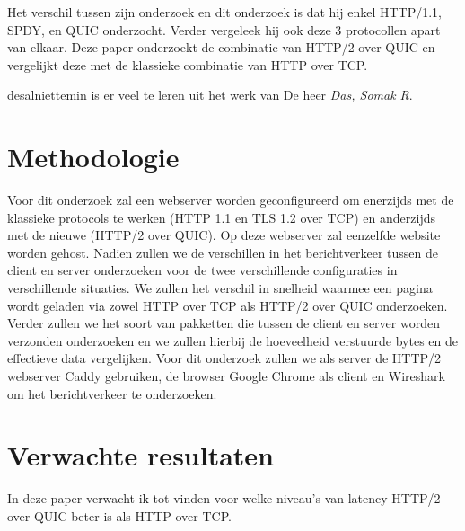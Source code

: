 \documentclass[fleqn,10pt]{voorstel}
\begin{document}
Het verschil tussen zijn onderzoek en dit onderzoek is dat hij enkel
HTTP/1.1, SPDY, en QUIC onderzocht. Verder vergeleek hij ook deze 3  protocollen apart van elkaar. Deze paper onderzoekt de combinatie van HTTP/2 over QUIC en vergelijkt deze met de klassieke combinatie van HTTP over TCP. 

desalniettemin is er veel te leren uit het werk van De heer \emph{Das, Somak R}.



\section{Methodologie}
\label{sec:methodologie}

Voor dit onderzoek zal een webserver worden geconfigureerd om 
enerzijds met de klassieke protocols te werken (HTTP 1.1 en TLS 1.2 over TCP) en anderzijds met de nieuwe (HTTP/2 over QUIC). Op deze webserver zal eenzelfde website worden gehost. Nadien zullen we de verschillen in het berichtverkeer tussen de client en server onderzoeken voor de twee verschillende configuraties in verschillende situaties.
We zullen het verschil in snelheid waarmee een pagina wordt
geladen via zowel HTTP over TCP als HTTP/2 over QUIC
onderzoeken. Verder zullen we het soort van pakketten die
tussen de client en server worden verzonden onderzoeken
en we zullen hierbij de hoeveelheid verstuurde bytes en de
effectieve data vergelijken.
Voor dit onderzoek zullen we als server de HTTP/2 webserver Caddy gebruiken, de browser Google Chrome als client en Wireshark om het berichtverkeer te onderzoeken. 


\section{Verwachte resultaten}
\label{sec:verwachte_resultaten}
In deze paper verwacht ik tot vinden voor welke niveau's van latency HTTP/2 over QUIC beter is als HTTP over TCP.

\end{document}
